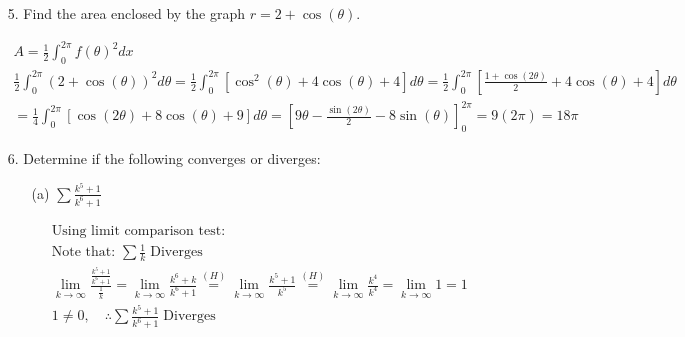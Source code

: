 \begin{itemize}
        \item [5.] Find the area enclosed by the graph $r=2+\cos(\theta)$.
        \\
        \begin{mdframed}
            \begin{equation*}
                \begin{gathered}
                    A = \frac{1}{2}\int_{0}^{2\pi}f(\theta)^{2}dx \\
                    \frac{1}{2}\int_{0}^{2\pi}(2+\cos(\theta))^{2}d\theta =
                    \frac{1}{2}\int_{0}^{2\pi}\left[\cos^{2}(\theta)+4\cos(\theta)+4\right]d\theta =
                    \frac{1}{2}\int_{0}^{2\pi}\left[\frac{1+\cos(2\theta)}{2}+4\cos(\theta)+4\right]d\theta  \\
                    = \frac{1}{4}\int_{0}^{2\pi}\left[\cos(2\theta)+8\cos(\theta)+9\right]d\theta =
                    \left[
                        9\theta-\frac{\sin(2\theta)}{2}-8\sin(\theta)
                    \right]_{0}^{2\pi} =
                    9(2\pi) = \boxed{18\pi}
                \end{gathered}
            \end{equation*}
        \end{mdframed}

        \item [6.] Determine if the following converges or diverges:
    
            \begin{itemize}
                \item [(a)] $\sum\frac{k^{5}+1}{k^{6}+1}$
                \\
                \begin{mdframed}
                    \begin{equation*}
                        \begin{gathered}
                            \text{Using limit comparison test: }                        \\
                            \text{Note that: }\sum\frac{1}{k} \; \text{Diverges}        \\
                            \lim_{k \to \infty}\frac{\frac{k^{5}+1}{k^{6}+1}}{\frac{1}{k}}=
                            \lim_{k \to \infty}\frac{k^{6}+k}{k^{6}+1} \stackrel{(H)}{=}
                            \lim_{k \to \infty}\frac{k^{5}+1}{k^{5}} \stackrel{(H)}{=}
                            \lim_{k \to \infty}\frac{k^{4}}{k^{4}} = 
                            \lim_{k \to \infty} 1 = 1                                   \\
                            1 \neq 0, \quad \therefore \sum\frac{k^{5}+1}{k^{6}+1} \; \boxed{\text{Diverges}}
                        \end{gathered}
                    \end{equation*}
                \end{mdframed}


\end{itemize}
\end{itemize}
